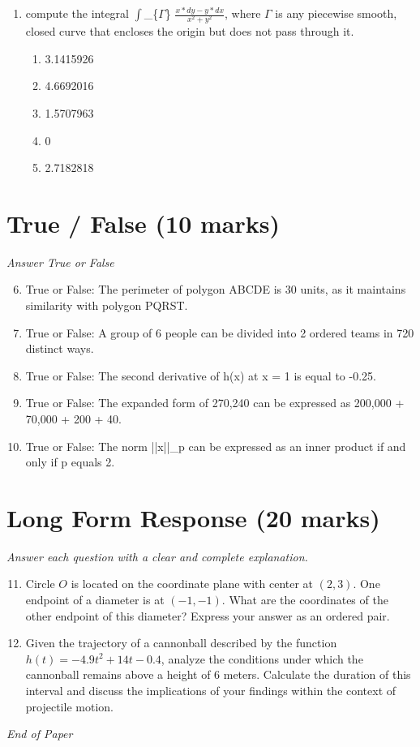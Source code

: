 \documentclass[12pt]{article}
\begin{document}
\begin{enumerate}[label=\arabic*.]
\begin{enumerate}[label=(\alph*)]
    \item 25
    \item 22
    \item 30
    \item 27
    \item 29
\end{enumerate}
\item compute the integral \ensuremath{\int}\_\{\ensuremath{\Gamma}\} \ensuremath{\frac{x*dy-y*dx}{x^2+y^2}}, where $\Gamma$ is any piecewise smooth, closed curve that encloses the origin but does not pass through it.
\begin{enumerate}[label=(\alph*)]
    \item 3.1415926
    \item 4.6692016
    \item 1.5707963
    \item 0
    \item 2.7182818
\end{enumerate}
\end{enumerate}

\section*{True / False (10 marks)}
\textit{Answer True or False}
\begin{enumerate}[label=\arabic*.]
\setcounter{enumi}{5}
\item True or False: The perimeter of polygon ABCDE is 30 units, as it maintains similarity with polygon PQRST.
\item True or False: A group of 6 people can be divided into 2 ordered teams in 720 distinct ways.
\item True or False: The second derivative of h(x) at x = 1 is equal to -0.25.
\item True or False: The expanded form of 270,240 can be expressed as 200,000 + 70,000 + 200 + 40.
\item True or False: The norm ||x||\_p can be expressed as an inner product if and only if p equals 2.
\end{enumerate}

\section*{Long Form Response (20 marks)}
\textit{Answer each question with a clear and complete explanation.}
\begin{enumerate}[label=\arabic*.]
\setcounter{enumi}{10}
\item Circle $O$ is located on the coordinate plane with center at $(2,3)$. One endpoint of a diameter is at $(-1,-1)$. What are the coordinates of the other endpoint of this diameter? Express your answer as an ordered pair.
\item Given the trajectory of a cannonball described by the function \( h(t) = -4.9 t^2 + 14 t - 0.4 \), analyze the conditions under which the cannonball remains above a height of 6 meters. Calculate the duration of this interval and discuss the implications of your findings within the context of projectile motion.
\end{enumerate}

\vfill
\noindent\textit{End of Paper}
\end{document}
